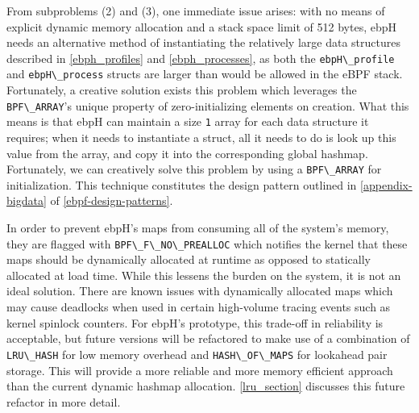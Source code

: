 \documentclass[
  12pt]{findlay}
\newcommand{\passthrough}[1]{#1}
\begin{document}
From subproblems (2) and (3), one immediate issue arises: with no means
of explicit dynamic memory allocation and a stack space limit of 512
bytes, ebpH needs an alternative method of instantiating the relatively
large data structures described in \autoref{ebph_profiles} and
\autoref{ebph_processes}, as both the
\passthrough{\lstinline!ebpH\_profile!} and
\passthrough{\lstinline!ebpH\_process!} structs are larger than would be
allowed in the eBPF stack. Fortunately, a creative solution exists this
problem which leverages the \passthrough{\lstinline!BPF\_ARRAY!}'s
unique property of zero-initializing elements on creation. What this
means is that ebpH can maintain a size \passthrough{\lstinline!1!} array
for each data structure it requires; when it needs to instantiate a
struct, all it needs to do is look up this value from the array, and
copy it into the corresponding global hashmap. Fortunately, we can
creatively solve this problem by using a
\passthrough{\lstinline!BPF\_ARRAY!} for initialization. This technique
constitutes the design pattern outlined in \autoref{appendix-bigdata} of
\autoref{ebpf-design-patterns}.

In order to prevent ebpH's maps from consuming all of the system's
memory, they are flagged with
\passthrough{\lstinline!BPF\_F\_NO\_PREALLOC!} which notifies the kernel
that these maps should be dynamically allocated at runtime as opposed to
statically allocated at load time. While this lessens the burden on the
system, it is not an ideal solution. There are known issues with
dynamically allocated maps \autocite{starovoitov16prealloc} which may
cause deadlocks when used in certain high-volume tracing events such as
kernel spinlock counters. For ebpH's prototype, this trade-off in
reliability is acceptable, but future versions will be refactored to
make use of a combination of \passthrough{\lstinline!LRU\_HASH!} for low
memory overhead and \passthrough{\lstinline!HASH\_OF\_MAPS!} for
lookahead pair storage. This will provide a more reliable and more
memory efficient approach than the current dynamic hashmap allocation.
\autoref{lru_section} discusses this future refactor in more detail.
\end{document}
